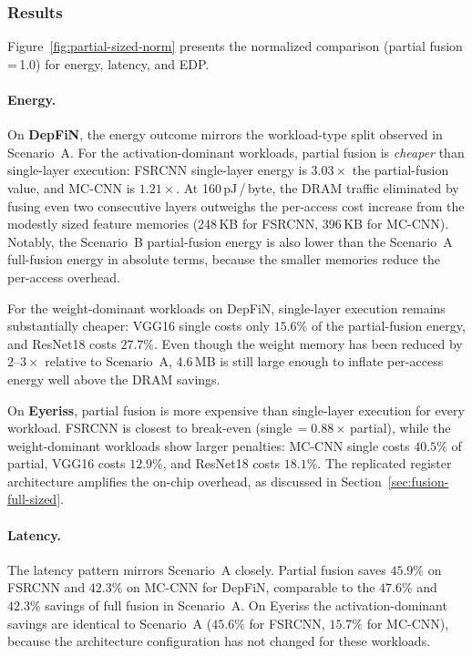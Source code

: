 \subsubsection{Results}

Figure~\ref{fig:partial-sized-norm} presents the normalized
comparison (partial fusion\,=\,1.0) for energy, latency, and EDP.

\paragraph{Energy.}
On \textbf{DepFiN}, the energy outcome mirrors the
workload-type split observed in Scenario~A.
For the activation-dominant workloads, partial fusion is
\emph{cheaper} than single-layer execution: FSRCNN single-layer
energy is $3.03\times$ the partial-fusion value, and MC-CNN is
$1.21\times$.
At 160\,pJ\,/\,byte, the DRAM traffic eliminated by fusing even
two consecutive layers outweighs the per-access cost increase from
the modestly sized feature memories (248\,KB for FSRCNN, 396\,KB
for MC-CNN).
Notably, the Scenario~B partial-fusion energy is also lower than
the Scenario~A full-fusion energy in absolute terms, because the smaller
memories reduce the per-access overhead.

For the weight-dominant workloads on DepFiN, single-layer
execution remains substantially cheaper: VGG16 single costs only
$15.6\%$ of the partial-fusion energy, and ResNet18 costs
$27.7\%$.
Even though the weight memory has been reduced by $2$--$3\times$
relative to Scenario~A, 4.6\,MB is still large enough to
inflate per-access energy well above the DRAM savings.

On \textbf{Eyeriss}, partial fusion is more expensive than
single-layer execution for every workload.
FSRCNN is closest to break-even (single\,$= 0.88\times$\,partial),
while the weight-dominant workloads show larger penalties:
MC-CNN single costs $40.5\%$ of partial, VGG16 costs $12.9\%$,
and ResNet18 costs $18.1\%$.
The replicated register architecture amplifies the on-chip
overhead, as discussed in Section~\ref{sec:fusion-full-sized}.

\paragraph{Latency.}
The latency pattern mirrors Scenario~A closely.
Partial fusion saves $45.9\%$ on FSRCNN and $42.3\%$ on MC-CNN
for DepFiN, comparable to the $47.6\%$ and $42.3\%$ savings of
full fusion in Scenario~A.
On Eyeriss the activation-dominant savings are identical to
Scenario~A ($45.6\%$ for FSRCNN, $15.7\%$ for MC-CNN), because
the architecture configuration has not changed for these
workloads.

